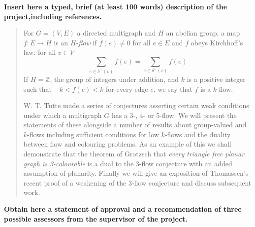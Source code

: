 \documentclass[11pt]{article}
\begin{document}
\newpage

\textbf{Insert here a typed, brief (at least 100 words) description of the project,\linebreak including references.} 

\begin{quote}
For $G = (V,E)$ a directed multigraph and $H$ an abelian group, a map $f: E \to H$ is an $H$-\textit{flow} if $f(e) \neq 0$ for all $e \in E$ and $f$ obeys Kirchhoff's law: for all $v \in V$
$$\sum_{e \in \delta^+(v)} f(e) = \sum_{e \in \delta^-(v)} f(e)$$
If $H = \mathbb{Z}$, the group of integers under addition, and $k$ is a positive integer such that $-k < f(e) < k$ for every edge $e$, we say that $f$ is a $k$-flow. 

W. T. Tutte made a series of conjectures asserting certain weak conditions under which a multigraph $G$ has a 3-, 4- or 5-flow.  We will present the statements of these alongside a number of results about group-valued and $k$-flows including sufficient conditions for low $k$-flows and the duality between flow and colouring problems. As an example of this we shall demonstrate that the theorem of Grotzsch that \emph{every triangle free planar graph is 3-colourable} is a dual to the 3-flow conjecture with an added assumption of planarity. Finally we will give an exposition of Thomassen's recent proof of a weakening of the 3-flow conjecture and discuss subsequent work.




\nocite{thom}
\nocite{GT}
\nocite{lova}
\nocite{T1}
\nocite{T2}



\end{quote}



\newpage

\textbf{Obtain here a statement of approval and a recommendation of three possible assessors from the supervisor of the
  project.}
\end{document}
